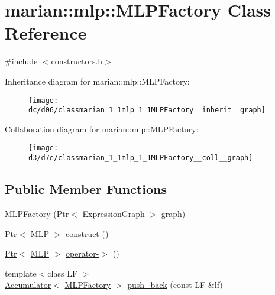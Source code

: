 \hypertarget{classmarian_1_1mlp_1_1MLPFactory}{}\section{marian\+:\+:mlp\+:\+:M\+L\+P\+Factory Class Reference}
\label{classmarian_1_1mlp_1_1MLPFactory}


{\ttfamily \#include $<$constructors.\+h$>$}



Inheritance diagram for marian\+:\+:mlp\+:\+:M\+L\+P\+Factory\+:
\nopagebreak
\begin{figure}[H]
\begin{center}
\leavevmode
\texttt{[image: dc/d06/classmarian\_1\_1mlp\_1\_1MLPFactory\_\_inherit\_\_graph]}
\end{center}
\end{figure}


Collaboration diagram for marian\+:\+:mlp\+:\+:M\+L\+P\+Factory\+:
\nopagebreak
\begin{figure}[H]
\begin{center}
\leavevmode
\texttt{[image: d3/d7e/classmarian\_1\_1mlp\_1\_1MLPFactory\_\_coll\_\_graph]}
\end{center}
\end{figure}
\subsection*{Public Member Functions}
\begin{DoxyCompactItemize}
\item 
\hyperlink{classmarian_1_1mlp_1_1MLPFactory_a135e6f01d76d5f10d687e5e63e0a7dbe}{M\+L\+P\+Factory} (\hyperlink{namespacemarian_ad1a373be43a00ef9ce35666145137b08}{Ptr}$<$ \hyperlink{classmarian_1_1ExpressionGraph}{Expression\+Graph} $>$ graph)
\item 
\hyperlink{namespacemarian_ad1a373be43a00ef9ce35666145137b08}{Ptr}$<$ \hyperlink{classmarian_1_1mlp_1_1MLP}{M\+LP} $>$ \hyperlink{classmarian_1_1mlp_1_1MLPFactory_adadee03fb4f6a53f3332d86b6571cfd7}{construct} ()
\item 
\hyperlink{namespacemarian_ad1a373be43a00ef9ce35666145137b08}{Ptr}$<$ \hyperlink{classmarian_1_1mlp_1_1MLP}{M\+LP} $>$ \hyperlink{classmarian_1_1mlp_1_1MLPFactory_a1b69334212c9c9c79d384a868b375be6}{operator-\/$>$} ()
\item 
{\footnotesize template$<$class LF $>$ }\\\hyperlink{classmarian_1_1Accumulator}{Accumulator}$<$ \hyperlink{classmarian_1_1mlp_1_1MLPFactory}{M\+L\+P\+Factory} $>$ \hyperlink{classmarian_1_1mlp_1_1MLPFactory_a7920938cb7287430fd3f8feac3f9729d}{push\+\_\+back} (const LF \&lf)
\end{DoxyCompactItemize}
